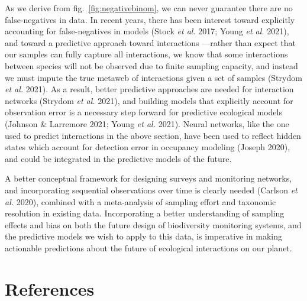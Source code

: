 \documentclass[10pt,oneside]{article}
\begin{document}
As we derive from fig.~\ref{fig:negativebinom}, we can never guarantee
there are no false-negatives in data. In recent years, there has been
interest toward explicitly accounting for false-negatives in models
(Stock \emph{et al.} 2017; Young \emph{et al.} 2021), and toward a
predictive approach toward interactions ---rather than expect that our
samples can fully capture all interactions, we know that some
interactions between species will not be observed due to finite sampling
capacity, and instead we must impute the true metaweb of interactions
given a set of samples (Strydom \emph{et al.} 2021). As a result, better
predictive approaches are needed for interaction networks (Strydom
\emph{et al.} 2021), and building models that explicitly account for
observation error is a necessary step forward for predictive ecological
models (Johnson \& Larremore 2021; Young \emph{et al.} 2021). Neural
networks, like the one used to predict interactions in the above
section, have been used to reflect hidden states which account for
detection error in occupancy modeling (Joseph 2020), and could be
integrated in the predictive models of the future.

A better conceptual framework for designing surveys and monitoring
networks, and incorporating sequential observations over time is clearly
needed (Carlson \emph{et al.} 2020), combined with a meta-analysis of
sampling effort and taxonomic resolution in existing data. Incorporating
a better understanding of sampling effects and bias on both the future
design of biodiversity monitoring systems, and the predictive models we
wish to apply to this data, is imperative in making actionable
predictions about the future of ecological interactions on our planet.

\hypertarget{references}{%
\section*{References}\label{references}}
\end{document}
